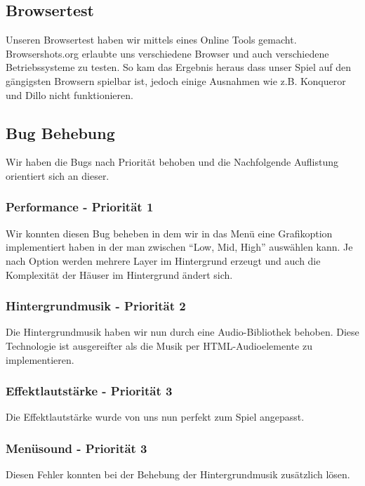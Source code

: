 \subsection{Browsertest}
Unseren Browsertest haben wir mittels eines Online Tools gemacht. Browsershots.org \cite{browsershots} erlaubte uns verschiedene Browser und auch verschiedene Betriebssysteme zu testen. So kam das Ergebnis heraus dass unser Spiel auf den gängigsten Browsern spielbar ist, jedoch einige Ausnahmen wie z.B. Konqueror und Dillo nicht funktionieren.
\subsection{Bug Behebung}
Wir haben die Bugs nach Priorität behoben und die Nachfolgende Auflistung orientiert sich an dieser.
\subsubsection{Performance - Priorität 1}
Wir konnten diesen Bug beheben in dem wir in das Menü eine Grafikoption implementiert haben in der man zwischen ``Low, Mid, High'' auswählen kann. Je nach Option werden mehrere Layer im Hintergrund erzeugt und auch die Komplexität der Häuser im Hintergrund ändert sich.
\subsubsection{Hintergrundmusik - Priorität 2}
Die Hintergrundmusik haben wir nun durch eine Audio-Bibliothek behoben. Diese Technologie ist ausgereifter als die Musik per HTML-Audioelemente zu implementieren.
\subsubsection{Effektlautstärke - Priorität 3}
Die Effektlautstärke wurde von uns nun perfekt zum Spiel angepasst.
\subsubsection{Menüsound - Priorität 3}
Diesen Fehler konnten bei der Behebung der Hintergrundmusik zusätzlich lösen.